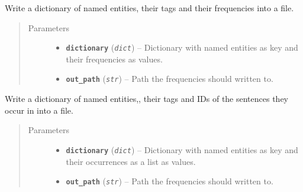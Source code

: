 \documentclass[letterpaper,10pt,english]{sphinxmanual}
\begin{document}

\begin{fulllineitems}
\label{src.prep.nes:src.prep.nes.extract_nes.write_dict_into_file}
Write a dictionary of named entities, their tags and their frequencies into a file.
\begin{quote}\begin{description}
\item[{Parameters}] \leavevmode\begin{itemize}
\item {} 
\textbf{\texttt{dictionary}} (\emph{\texttt{dict}}) -- Dictionary with named entities as key and their frequencies as values.

\item {} 
\textbf{\texttt{out\_path}} (\emph{\texttt{str}}) -- Path the frequencies should written to.

\end{itemize}

\end{description}\end{quote}

\end{fulllineitems}


\begin{fulllineitems}
\label{src.prep.nes:src.prep.nes.extract_nes.write_ids_into_file}
Write a dictionary of named entities,, their tags and IDs of the sentences they occur in into a file.
\begin{quote}\begin{description}
\item[{Parameters}] \leavevmode\begin{itemize}
\item {} 
\textbf{\texttt{dictionary}} (\emph{\texttt{dict}}) -- Dictionary with named entities as key and their occurrences as a list as values.

\item {} 
\textbf{\texttt{out\_path}} (\emph{\texttt{str}}) -- Path the frequencies should written to.

\end{itemize}

\end{description}\end{quote}

\end{fulllineitems}
\end{document}
